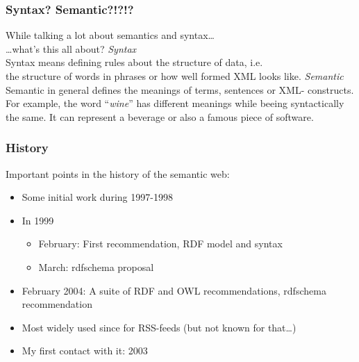 \documentclass{beamer}
\begin{document}
        \begin{frame}
            \frametitle{Syntax? Semantic?!?!?}

            While talking a lot about semantics and syntax\ldots\\
            \ldots what's this all about?
            \pause
            \vskip 0.3cm
            \textit{Syntax}\\
            Syntax means defining rules about the structure of data, i.e.\\
            the structure of words in phrases or how well formed XML looks like.
            \pause
            \vskip 0.3cm
            \textit{Semantic}\\
            Semantic in general defines the meanings of terms, sentences or XML-
            constructs.
            \pause
            \vskip 0.3cm
            For example, the word ``\textit{wine}'' has different meanings while beeing syntactically the same.
            It can represent a beverage or also a famous piece of software.
        \end{frame}

        \begin{frame}
            \frametitle{History}

            Important points in the history of the semantic web:
            \pause
            \vskip 0.7cm

            \begin{itemize}
                \item Some initial work during 1997-1998
                \pause
                \item In 1999
                    \pause
                    \begin{itemize}
                        \item February: First recommendation, RDF model and syntax
                        \pause
                        \item March: rdfschema proposal
                    \end{itemize}
                \pause
                \item February 2004: A suite of RDF and OWL recommendations, rdfschema recommendation
                \pause
                \item Most widely used since for RSS-feeds (but not known for that\ldots)
                \pause
                \item My first contact with it: 2003
            \end{itemize}
        \end{frame}
\end{document}
